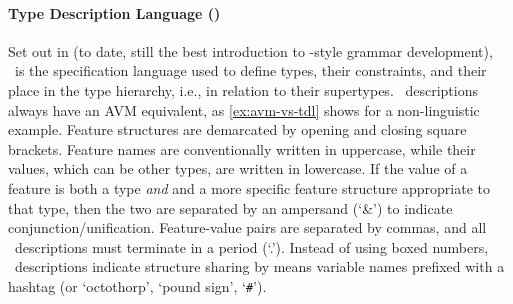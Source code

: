 \paragraph{Type Description Language (\tdl)}
\label{par:tdl}

Set out in \citet{copestake2002implementing} (to date, still the best
introduction to \delphin-style grammar development), \tdl\ is the specification
language used to define types, their constraints, and their place in the type
hierarchy, i.e., in relation to their supertypes. \tdl\ descriptions always
have an AVM equivalent, as \cref{ex:avm-vs-tdl} shows for a non-linguistic
example. Feature structures are demarcated by opening and closing square
brackets. Feature names are conventionally written in uppercase, while their
values, which can be other types, are written in lowercase. If the value of a
feature is both a type \emph{and} and a more specific feature structure
appropriate to that type, then the two are separated by an ampersand (`\&') to
indicate conjunction/unification. Feature-value pairs are separated by commas,
and all \tdl\ descriptions must terminate in a period (`.'). Instead of using
boxed numbers, \tdl\ descriptions indicate structure sharing by means variable
names prefixed with a hashtag (or `octothorp', `pound sign', `\texttt{\#}').


